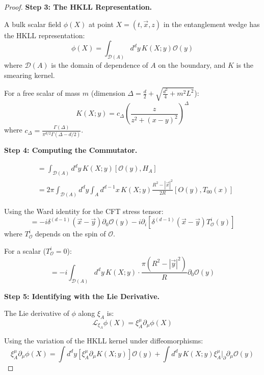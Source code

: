 \documentclass[12pt,a4paper]{article}
\begin{document}
\begin{proof}
\textbf{Step 3: The HKLL Representation.}

A bulk scalar field $\phi(X)$ at point $X = (t, \vec{x}, z)$ in the entanglement wedge has the HKLL representation:
\begin{equation}
\phi(X) = \int_{\mathcal{D}(A)} d^d y \, K(X; y) \mathcal{O}(y)
\end{equation}
where $\mathcal{D}(A)$ is the domain of dependence of $A$ on the boundary, and $K$ is the smearing kernel.

For a free scalar of mass $m$ (dimension $\Delta = \frac{d}{2} + \sqrt{\frac{d^2}{4} + m^2 L^2}$):
\begin{equation}
K(X; y) = c_\Delta \left(\frac{z}{z^2 + (x-y)^2}\right)^\Delta
\end{equation}
where $c_\Delta = \frac{\Gamma(\Delta)}{\pi^{d/2}\Gamma(\Delta - d/2)}$.

\textbf{Step 4: Computing the Commutator.}

\begin{align}
[\phi(X), H_A] &= \int_{\mathcal{D}(A)} d^d y \, K(X; y) [\mathcal{O}(y), H_A] \\
&= 2\pi \int_{\mathcal{D}(A)} d^d y \int_A d^{d-1}x \, K(X; y) \frac{R^2 - |\vec{x}|^2}{2R} [O(y), T_{00}(x)]
\end{align}

Using the Ward identity for the CFT stress tensor:
\begin{equation}
[T_{00}(x), \mathcal{O}(y)] = -i\delta^{(d-1)}(\vec{x} - \vec{y})\partial_0 \mathcal{O}(y) - i\partial_i[\delta^{(d-1)}(\vec{x} - \vec{y}) T^i_{\mathcal{O}}(y)]
\end{equation}
where $T^i_{\mathcal{O}}$ depends on the spin of $\mathcal{O}$.

For a scalar ($T^i_\mathcal{O} = 0$):
\begin{equation}
[\phi(X), H_A] = -i\int_{\mathcal{D}(A)} d^d y \, K(X; y) \cdot \frac{\pi(R^2 - |\vec{y}|^2)}{R} \partial_0 \mathcal{O}(y)
\end{equation}

\textbf{Step 5: Identifying with the Lie Derivative.}

The Lie derivative of $\phi$ along $\xi_A$ is:
\begin{equation}
\mathcal{L}_{\xi_A}\phi(X) = \xi_A^\mu \partial_\mu \phi(X)
\end{equation}

Using the variation of the HKLL kernel under diffeomorphisms:
\begin{equation}
\xi_A^\mu \partial_\mu \phi(X) = \int d^d y \left[\xi_A^\mu \partial_\mu K(X; y)\right] \mathcal{O}(y) + \int d^d y \, K(X; y) \xi_A^\mu|_{\partial} \partial_\mu \mathcal{O}(y)
\end{equation}


\end{proof}
\end{document}
